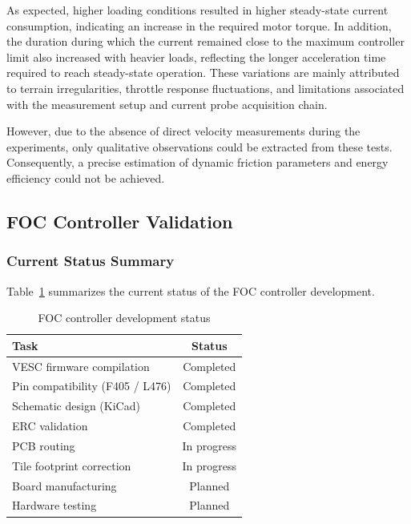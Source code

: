 As expected, higher loading conditions resulted in higher steady-state current consumption, indicating an increase in the required motor torque. In addition, the duration during which the current remained close to the maximum controller limit also increased with heavier loads, reflecting the longer acceleration time required to reach steady-state operation.
These variations are mainly attributed to terrain irregularities, throttle response fluctuations, and limitations associated with the measurement setup and current probe acquisition chain.

However, due to the absence of direct velocity measurements during the experiments, only qualitative observations could be extracted from these tests. Consequently, a precise estimation of dynamic friction parameters and energy efficiency could not be achieved.

\subsection{FOC Controller Validation}

\subsubsection{Current Status Summary}

Table~\ref{tab:foc_status} summarizes the current status of the FOC controller development.

\begin{table}[htbp]
\caption{FOC controller development status}
\label{tab:foc_status}
\centering
\begin{tabular}{l c}
\toprule
\textbf{Task} & \textbf{Status} \\
\midrule
VESC firmware compilation & Completed \\
Pin compatibility (F405 / L476) & Completed \\
Schematic design (KiCad) & Completed \\
ERC validation & Completed \\
PCB routing & In progress \\
Tile footprint correction & In progress \\
Board manufacturing & Planned \\
Hardware testing & Planned \\
\bottomrule
\end{tabular}
\end{table}


